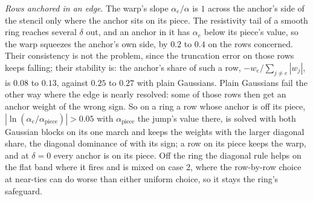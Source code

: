 \documentclass[11pt]{amsart}
\theoremstyle{definition}
\theoremstyle{remark}
\newcommand{\para}[1]{\par\smallskip\noindent\textit{#1}.\enspace}
\begin{document}
\para{Rows anchored in an edge}
The warp's slope $\alpha_e / \alpha$ is $1$ across the anchor's side of the
stencil only where the anchor sits on its piece. The resistivity tail of a
smooth ring reaches several $\delta$ out, and an anchor in it has $\alpha_e$
below its piece's value, so the warp squeezes the anchor's own side, by
$0.2$ to $0.4$ on the rows concerned. Their consistency is not the problem,
since the truncation error on those rows keeps falling; their stability
is: the anchor's share of such a row, $-w_e / \sum_{j \ne e} |w_j|$, is
$0.08$ to $0.13$, against $0.25$ to $0.27$ with plain Gaussians. Plain
Gaussians fail the other way where the edge is nearly resolved: some of
those rows then get an anchor weight of the wrong sign. So on a ring a row whose
anchor is off its piece, $|\ln (\alpha_e / \alpha_{\mathrm{piece}})| > 0.05$
with $\alpha_{\mathrm{piece}}$ the jump's value there, is solved with both
Gaussian blocks on its one march and keeps the weights with the larger
diagonal share, the diagonal dominance of \cite[App.~B]{Martin2016} with
its sign; a row on its piece keeps the warp, and at $\delta = 0$ every
anchor is on its piece. Off the ring the diagonal rule helps on the flat
band where
it fires and is mixed on case 2, where the row-by-row choice at near-ties
can do worse than either uniform choice, so it stays the ring's safeguard.

\end{document}
